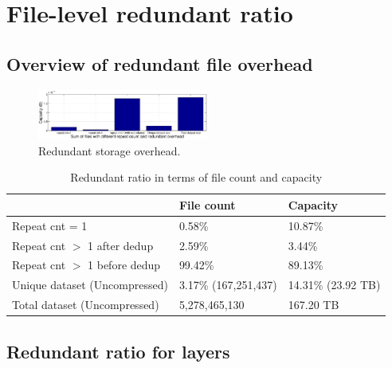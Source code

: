 \section{File-level redundant ratio}
\label{sec:dedup}

\subsection{Overview of redundant file overhead}

\begin{figure}
	\centering
	\includegraphics[width=0.5\textwidth]{graphs/capacity_data_ratio.eps}
	\caption{Redundant storage overhead.
	}
	\label{fig:overview_redundant_overhead}
\end{figure}

\begin{table} 
	\centering 
	\scriptsize  
	\caption{Redundant ratio in terms of file count and capacity} \label{tbl:redundant_ratio} 
	\begin{tabular}{|l|l|l|}%
		\hline 
		       & File count & Capacity \\
		\hline
		Repeat cnt = 1 & 0.58\% & 10.87\%\\
		\hline
		Repeat cnt $>$ 1 after dedup & 2.59\% & 3.44\%\\
		\hline
		Repeat cnt $>$ 1 before dedup  & 99.42\%  & 89.13\%\\
		\hline
		Unique dataset (Uncompressed) & 3.17\% (167,251,437)  &  14.31\% (23.92 TB) \\
		\hline 
		Total dataset (Uncompressed) & 5,278,465,130 & 167.20 TB \\
		\hline 	
	\end{tabular} 
\end{table} 

\subsection{Redundant ratio for layers}

